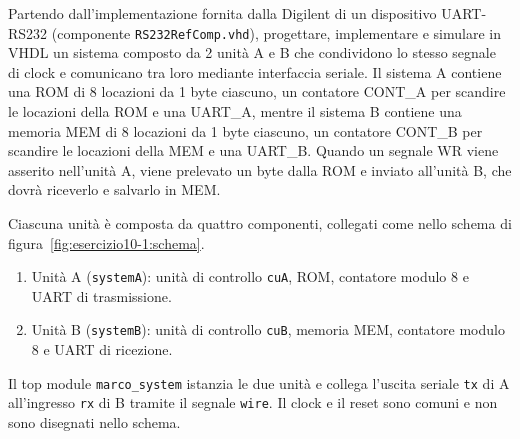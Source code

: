 \label{sec:esercizio10-1}

\begin{traccia}
Partendo dall'implementazione fornita dalla Digilent di un dispositivo UART-RS232 (componente \texttt{RS232RefComp.vhd}), progettare, implementare e simulare in VHDL un sistema composto da 2 unità A e B che condividono lo stesso segnale di clock e comunicano tra loro mediante interfaccia seriale. Il sistema A contiene una ROM di 8 locazioni da 1 byte ciascuno, un contatore CONT\_A per scandire le locazioni della ROM e una UART\_A, mentre il sistema B contiene una memoria MEM di 8 locazioni da 1 byte ciascuno, un contatore CONT\_B per scandire le locazioni della MEM e una UART\_B. Quando un segnale WR viene asserito nell'unità A, viene prelevato un byte dalla ROM e inviato all'unità B, che dovrà riceverlo e salvarlo in MEM.
\end{traccia}

\progetto

Ciascuna unità è composta da quattro componenti, collegati come nello schema di figura~\ref{fig:esercizio10-1:schema}.
\begin{enumerate}
  \item Unità A (\texttt{systemA}): unità di controllo \texttt{cuA}, ROM, contatore modulo 8 e UART di trasmissione.
  \item Unità B (\texttt{systemB}): unità di controllo \texttt{cuB}, memoria MEM, contatore modulo 8 e UART di ricezione.
\end{enumerate}
Il top module \texttt{marco\_system} istanzia le due unità e collega l'uscita seriale \texttt{tx} di A all'ingresso \texttt{rx} di B tramite il segnale \texttt{wire}. Il clock e il reset sono comuni e non sono disegnati nello schema.

